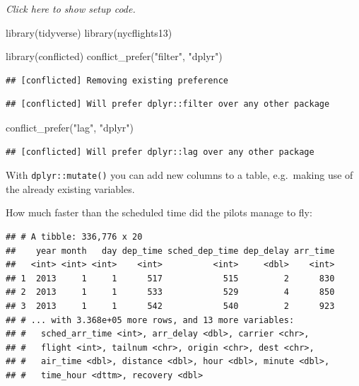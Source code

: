\documentclass[]{book}
\newenvironment{Shaded}{}{}
\newcommand{\DataTypeTok}[1]{#1}
\newcommand{\KeywordTok}[1]{\textcolor[rgb]{0.00,0.00,1.00}{#1}}
\newcommand{\NormalTok}[1]{#1}
\newcommand{\OperatorTok}[1]{#1}
\newcommand{\StringTok}[1]{\textcolor[rgb]{0.00,0.50,0.50}{#1}}
\begin{document}
\emph{Click here to show setup code.}

\begin{Shaded}
\begin{Highlighting}[]
\KeywordTok{library}\NormalTok{(tidyverse)}
\KeywordTok{library}\NormalTok{(nycflights13)}

\KeywordTok{library}\NormalTok{(conflicted)}
\KeywordTok{conflict_prefer}\NormalTok{(}\StringTok{"filter"}\NormalTok{, }\StringTok{"dplyr"}\NormalTok{)}
\end{Highlighting}
\end{Shaded}

\begin{verbatim}
## [conflicted] Removing existing preference
\end{verbatim}

\begin{verbatim}
## [conflicted] Will prefer dplyr::filter over any other package
\end{verbatim}

\begin{Shaded}
\begin{Highlighting}[]
\KeywordTok{conflict_prefer}\NormalTok{(}\StringTok{"lag"}\NormalTok{, }\StringTok{"dplyr"}\NormalTok{)}
\end{Highlighting}
\end{Shaded}

\begin{verbatim}
## [conflicted] Will prefer dplyr::lag over any other package
\end{verbatim}

With \texttt{dplyr::mutate()} you can add new columns to a table, e.g.~making use of the already existing variables.

How much faster than the scheduled time did the pilots manage to fly:

\begin{Shaded}
\end{Shaded}

\begin{verbatim}
## # A tibble: 336,776 x 20
##    year month   day dep_time sched_dep_time dep_delay arr_time
##   <int> <int> <int>    <int>          <int>     <dbl>    <int>
## 1  2013     1     1      517            515         2      830
## 2  2013     1     1      533            529         4      850
## 3  2013     1     1      542            540         2      923
## # ... with 3.368e+05 more rows, and 13 more variables:
## #   sched_arr_time <int>, arr_delay <dbl>, carrier <chr>,
## #   flight <int>, tailnum <chr>, origin <chr>, dest <chr>,
## #   air_time <dbl>, distance <dbl>, hour <dbl>, minute <dbl>,
## #   time_hour <dttm>, recovery <dbl>
\end{verbatim}
\end{document}
